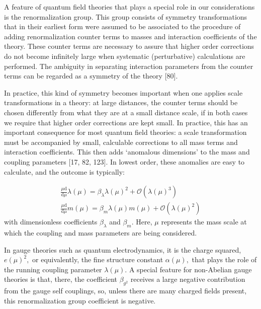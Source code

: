 \documentclass[main.tex]{subfiles}
\begin{document}
A feature of quantum field theories that plays a special role in our considerations is the renormalization group. This group consists of symmetry transformations that in their earliest form were assumed to be associated to the procedure of adding renormalization counter terms to masses and interaction coefficients of the theory. These counter terms are necessary to assure that higher order corrections do not become infinitely large when systematic (perturbative) calculations are performed. The ambiguity in separating interaction parameters from the counter terms can be regarded as a symmetry of the theory [80]. 

In practice, this kind of symmetry becomes important when one applies scale transformations in a theory: at large distances, the counter terms should be chosen differently from what they are at a small distance scale, if in both cases we require that higher order corrections are kept small. In practice, this has an important consequence for most quantum field theories: a scale transformation must be accompanied by small, calculable corrections to all mass terms and interaction coefficients. This then adds ‘anomalous dimensions’ to the mass and coupling parameters [17, 82, 123]. In lowest order, these anomalies are easy to calculate, and the outcome is typically:

$$
\begin{array}{l}
{\frac{\mu \mathrm{d}}{\mathrm{d} \mu} \lambda(\mu)=\beta_{\lambda} \lambda(\mu)^{2}+\mathcal{O}\left(\lambda(\mu)^{3}\right)} \\
{\frac{\mu \mathrm{d}}{\mathrm{d} \mu} m(\mu)=\beta_{m} \lambda(\mu) m(\mu)+\mathcal{O}\left(\lambda(\mu)^{2}\right)}
\end{array}
$$
with dimensionless coefficients $\beta_{\lambda}$ and $\beta_{m} .$ Here, $\mu$ represents the mass scale at which the coupling and mass parameters are being considered.

In gauge theories such as quantum electrodynamics, it is the charge squared, $e(\mu)^{2},$ or equivalently, the fine structure constant $\alpha(\mu),$ that plays the role of the running coupling parameter $\lambda(\mu) .$ A special feature for non-Abelian gauge theories is that, there, the coefficient $\beta_{g^{2}}$ receives a large negative contribution from the gauge self couplings, so, unless there are many charged fields present, this renormalization group coefficient is negative.
\end{document}
